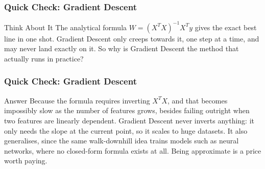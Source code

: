 \begin{frame}[fragile]\frametitle{Quick Check: Gradient Descent}
\begin{block}{Think About It}
The analytical formula $W = (X^TX)^{-1}X^Ty$ gives the exact best line in one shot. Gradient Descent only creeps towards it, one step at a time, and may never land exactly on it. So why is Gradient Descent the method that actually runs in practice?
\end{block}
\end{frame}

\begin{frame}[fragile]\frametitle{Quick Check: Gradient Descent}
\begin{block}{Answer}
Because the formula requires inverting $X^TX$, and that becomes impossibly slow as the number of features grows, besides failing outright when two features are linearly dependent. Gradient Descent never inverts anything: it only needs the slope at the current point, so it scales to huge datasets. It also generalises, since the same walk-downhill idea trains models such as neural networks, where no closed-form formula exists at all. Being approximate is a price worth paying.
\end{block}
\end{frame}









